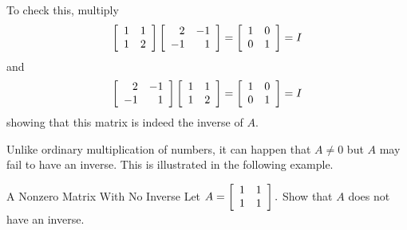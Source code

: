 \begin{solution} To check this, multiply
\begin{equation*}
\left[
\begin{array}{rr}
1 & 1 \\
1 & 2
\end{array}
\right] \left[
\begin{array}{rr}
2 & -1 \\
-1 & 1
\end{array}
\right] =\allowbreak \left[
\begin{array}{rr}
1 & 0 \\
0 & 1
\end{array}
\right] = I 
\end{equation*}
and
\begin{equation*}
\left[
\begin{array}{rr}
2 & -1 \\
-1 & 1
\end{array}
\right] \left[
\begin{array}{rr}
1 & 1 \\
1 & 2
\end{array}
\right] =\allowbreak \left[
\begin{array}{rr}
1 & 0 \\
0 & 1
\end{array}
\right] = I 
\end{equation*}
showing that this matrix is indeed the inverse of $A.$
\end{solution}

Unlike ordinary multiplication of numbers, it can happen that $A\neq 0$ but 
$A$ may fail to have an inverse. This is illustrated in the following example.

\begin{example}{A Nonzero Matrix With No Inverse}\label{exa:noninvertiblematrix}
Let $A=\left[
\begin{array}{rr}
1 & 1 \\
1 & 1
\end{array}
\right] .$ Show that $A$ does not have an inverse.
\end{example}

